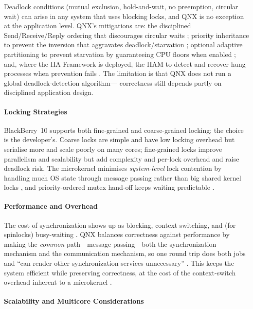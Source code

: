 Deadlock conditions (mutual exclusion, hold-and-wait, no preemption,
circular wait) can arise in any system that uses blocking locks, and
QNX is no exception at the application level. QNX's mitigations are:
the disciplined Send/Receive/Reply ordering that discourages circular
waits \citep{qnx_ipc}; priority inheritance to prevent the inversion
that aggravates deadlock/starvation \citep{qnx_kernel_sysarch,
qnx_ipc}; optional adaptive partitioning to prevent starvation by guaranteeing
CPU floors when enabled \citep{qnx_aps}; and, where the HA Framework is
deployed, the HAM to detect and recover hung processes when prevention
fails \citep{qnx_ham}. The limitation is
that QNX does not run a global deadlock-detection algorithm---
correctness still depends partly on disciplined application design.

\paragraph{Locking Strategies}

BlackBerry~10 supports both fine-grained and coarse-grained locking;
the choice is the developer's. Coarse locks are simple and have low locking
overhead but serialise more and scale poorly on many cores;
fine-grained locks improve parallelism and scalability but add
complexity and per-lock overhead and raise deadlock risk. The
microkernel minimises \emph{system-level} lock contention by handling
much OS state through message passing rather than big shared kernel
locks \citep{qnx_kernel_sysarch, qnx_ipc}, and priority-ordered mutex
hand-off keeps waiting predictable \citep{qnx_kernel_sysarch}.

\paragraph{Performance and Overhead}

The cost of synchronization shows up as blocking, context switching,
and (for spinlocks) busy-waiting \citep{qnx_kernel_sysarch}. QNX
balances correctness against performance by making the \emph{common}
path---message passing---both the synchronization mechanism and the
communication mechanism, so one round trip does both jobs and ``can
render other synchronization services unnecessary''
\citep{qnx_kernel_sync}. This keeps the system efficient while
preserving correctness, at the cost of the context-switch overhead
inherent to a microkernel \citep{qnx_arm_memory}.

\paragraph{Scalability and Multicore Considerations}

